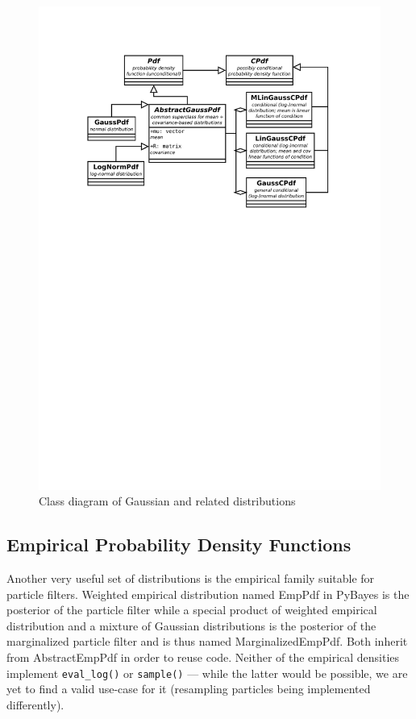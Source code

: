 \begin{figure}[h]
	\centering
	\includegraphics[width=\textwidth,keepaspectratio=true,clip=true,trim=3cm 173mm 3cm 3cm]{./diagrams/gaussian_pdfs.pdf}
	\vspace{-8mm}
	\caption{Class diagram of Gaussian and related distributions}
	\label{fig:DiaGaussPdfs}
\end{figure}

\subsection{Empirical Probability Density Functions}

Another very useful set of distributions is the empirical family suitable for particle filters.
Weighted empirical distribution named EmpPdf in PyBayes is the posterior {\pdf} of the
particle filter while a special product of weighted empirical distribution and a mixture of Gaussian
distributions is the posterior {\pdf} of the marginalized particle filter and is thus named
MarginalizedEmpPdf. Both inherit from AbstractEmpPdf in order to reuse code. Neither of the empirical
densities implement \verb|eval_log()| or \verb|sample()| --- while the latter would be possible, we
are yet to find a valid use-case for it (resampling particles being implemented differently).

